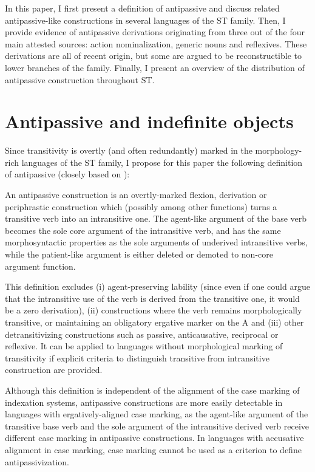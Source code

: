 \documentclass[oneside,a4paper,11pt]{article}
\begin{document}
In this paper, I first present a definition of antipassive and discuss related antipassive-like constructions in several languages of the ST family. Then, I provide evidence of antipassive derivations originating from three out of the four main attested sources: action nominalization, generic nouns and reflexives. These derivations are all of recent origin, but some are argued to be reconstructible to lower branches of the family. Finally, I present an overview of the distribution of antipassive construction throughout ST.

\section{Antipassive and indefinite objects}
Since transitivity is overtly (and often redundantly) marked in the morphology-rich languages of the ST family, I propose for this paper the following definition of antipassive (closely based on \citealt[146]{dixon94erg}):

\begin{exe}
\ex \label{ex:def}
\glt An antipassive construction is an overtly-marked flexion, derivation or periphrastic construction which (possibly among other functions) turns a transitive verb into an intransitive one. The agent-like argument of the base verb becomes the sole core argument of the intransitive verb, and has the same morphosyntactic properties as the sole arguments of underived intransitive verbs, while the patient-like argument is either deleted or demoted to non-core argument function.
\end{exe}

This definition excludes  (i) agent-preserving lability (since even if one could argue that the intransitive use of the verb is derived from the transitive one, it would be a zero derivation), (ii) constructions where the verb remains morphologically transitive, or maintaining an obligatory ergative marker on the A and (iii) other detransitivizing constructions such as passive, anticausative, reciprocal or reflexive. It can be applied to languages without morphological marking of transitivity if explicit criteria to distinguish transitive from intransitive construction are provided. 

Although this definition is independent of the alignment of the case marking of indexation systems, antipassive constructions are more easily detectable in languages with ergatively-aligned case marking, as the agent-like argument of the transitive base verb and the sole argument of the intransitive derived verb receive different case marking in antipassive constructions. In languages with accusative alignment in case marking, case marking cannot be used as a criterion to define antipassivization.
\end{document}
